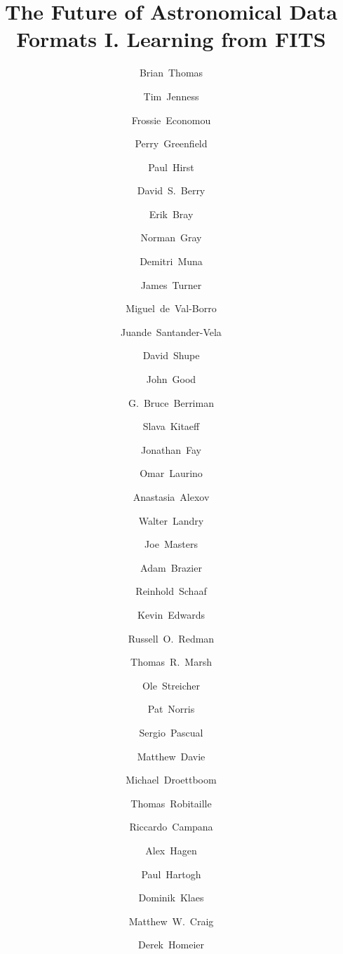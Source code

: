 \documentclass[final,authoryear,5p,times,twocolumn]{elsarticle}
\begin{document}
\begin{frontmatter}



\title{The Future of Astronomical Data Formats I. Learning from FITS}


\author[noao]{Brian~Thomas}
\author[cornell]{Tim~Jenness}
\author[noao]{Frossie~Economou}
\author[stsci]{Perry~Greenfield}
\author[geminin]{Paul~Hirst}
\author[jac]{David~S.~Berry}
\author[stsci]{Erik~Bray}
\author[glasgow]{Norman~Gray}
\author[ohio]{Demitri~Muna}
\author[geminis]{James~Turner}
\author[princeton]{Miguel~de~Val-Borro}
\author[iaa]{Juande~Santander-Vela}
\author[ipac]{David~Shupe}
\author[ipac]{John~Good}
\author[ipac]{G.~Bruce~Berriman}
\author[icrar]{Slava~Kitaeff}
\author[microsoft]{Jonathan~Fay}
\author[sao]{Omar~Laurino}
\author[stsci]{Anastasia~Alexov}
\author[ipac]{Walter~Landry}
\author[nrao]{Joe~Masters}
\author[cornell]{Adam~Brazier}
\author[aifa]{Reinhold~Schaaf}
\author[uwaterloo]{Kevin~Edwards}
\author[jac]{Russell~O.~Redman}
\author[warwick]{Thomas~R.~Marsh}
\author[aip]{Ole~Streicher}
\author[noao]{Pat~Norris}
\author[ucm]{Sergio~Pascual}
\author[unsw]{Matthew~Davie}
\author[stsci]{Michael~Droettboom}
\author[mpia]{Thomas~Robitaille}
\author[iasf]{Riccardo~Campana}
\author[psu]{Alex~Hagen}
\author[mps]{Paul~Hartogh}
\author[aifa]{Dominik~Klaes}
\author[msum]{Matthew~W.~Craig}
\author[cral]{Derek~Homeier}



\end{frontmatter}
\end{document}

